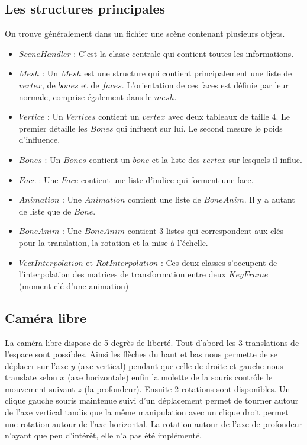 \documentclass[a4paper]{report}
\begin{document}
\subsection{Les structures principales}
\par
On trouve généralement dans un fichier une scène contenant plusieurs objets.

\begin{itemize}
\item $SceneHandler$ : C'est la classe centrale qui contient toutes les informations.
\item $Mesh$ : Un $Mesh$ est une structure qui contient principalement une liste de $vertex$, de $bones$ et de $faces$. L'orientation de ces faces est définie par leur normale, comprise également dans le $mesh$.
\item $Vertice$ : Un $Vertices$ contient un $vertex$ avec deux tableaux de taille 4. Le premier détaille les $Bones$ qui influent sur lui. Le second mesure le poids d'influence.
\item $Bones$ : Un $Bones$ contient un $bone$ et la liste des $vertex$ sur lesquels il influe.
\item $Face$ : Une $Face$ contient une liste d'indice qui forment une face.
\item $Animation$ : Une $Animation$ contient une liste de $BoneAnim$. Il y a autant de liste que de $Bone$.
\item $BoneAnim$ : Une $BoneAnim$ contient 3 listes qui correspondent aux clés pour la translation, la rotation et la mise à l'échelle.
\item $VectInterpolation$ et $RotInterpolation$ : Ces deux classes s'occupent de l'interpolation des matrices de transformation entre deux $KeyFrame$ (moment clé d'une animation)
\end{itemize}

\subsection{Caméra libre}
\par
La caméra libre dispose de 5 degrès de liberté. Tout d'abord les 3 translations de l'espace sont possibles. Ainsi les flèches du haut et bas nous permette de se déplacer sur l'axe $y$ (axe vertical) pendant que celle de droite et gauche nous translate selon $x$ (axe horizontale) enfin la molette de la souris contrôle le mouvement suivant $z$ (la profondeur). Ensuite 2 rotations sont disponibles. Un clique gauche souris maintenue suivi d'un déplacement permet de tourner autour de l'axe vertical tandis que la même manipulation avec un clique droit permet une rotation autour de l'axe horizontal. La rotation autour de l'axe de profondeur n'ayant que peu d'intérêt, elle n'a pas été implémenté. 
\end{document}
